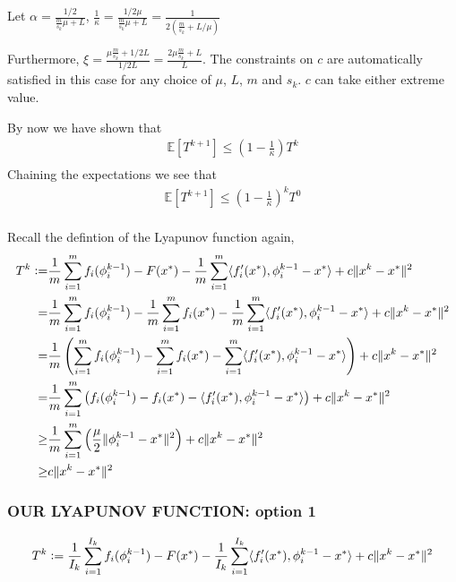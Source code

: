 \documentclass[11pt]{article}
\newcommand{\defeqq}{\vcentcolon=}
\begin{document}
		Let $\alpha = \frac{1/2}{\frac{m}{s_k}\mu+L}$, $\frac{1}{\kappa} = \frac{1/2 \mu}{ \frac{m}{s_k}\mu+L}=\frac{1}{2( \frac{m}{s_k}+L/\mu)}$
		
		Furthermore, $\xi =\frac{\mu \frac{m}{s_k}+1/2L}{1/2 L }  = \frac{2 \mu \frac{m}{s_k}+L}{ L }$. The constraints on $c$ are automatically satisfied in this case for any choice of $\mu$, $L$, $m$ and $s_k$. $c$ can take either extreme value. 
		
By now we have shown that 
\begin{align*}
		\mathbb{E}\left[ T^{k+1} \right] \leq \left(1-\frac{1}{\kappa} \right) T^k \\
\end{align*}
Chaining the expectations we see that 
\begin{align*}
		\mathbb{E}\left[ T^{k+1} \right] \leq \left(1-\frac{1}{\kappa} \right)^k T^0 \\
\end{align*}

Recall the defintion of the Lyapunov function again, 
\begin{align*}
	T^k \defeqq &  \frac{1}{m} \sum_{i =1}^{m} f_i(\phi_i^{k-1}) - F(x^*) - \frac{1}{m}  \sum_{i =1}^{m} \langle f'_i(x^*), \phi_i^{k-1} - x^*\rangle + c \|x^k - x^* \|^2 \\
	= & \frac{1}{m} \sum_{i =1}^{m} f_i(\phi_i^{k-1}) - \frac{1}{m} \sum_{i =1}^{m} f_i(x^*) - \frac{1}{m}  \sum_{i =1}^{m} \langle f'_i(x^*), \phi_i^{k-1} - x^*\rangle + c \|x^k - x^* \|^2 \\
	= & \frac{1}{m} \left(\sum_{i =1}^{m} f_i(\phi_i^{k-1}) -  \sum_{i =1}^{m} f_i(x^*) -  \sum_{i =1}^{m} \langle f'_i(x^*), \phi_i^{k-1} - x^*\rangle  \right) + c \|x^k - x^* \|^2 \\
	= & \frac{1}{m}\sum_{i =1}^{m} \left( f_i(\phi_i^{k-1}) -  f_i(x^*) - \langle f'_i(x^*), \phi_i^{k-1} - x^*\rangle  \right) + c \|x^k - x^* \|^2 \\
	\geq & \frac{1}{m}\sum_{i =1}^{m} \left(  \frac{\mu}{2} \| \phi_i^{k-1} - x^*\| ^2 \right) + c \|x^k - x^* \|^2 \\
	\geq &  c \|x^k - x^* \|^2
\end{align*}
\newpage

\subsubsection{OUR LYAPUNOV FUNCTION: option 1}

\begin{equation}
	T^k \defeqq \frac{1}{I_k} \sum_{i =1}^{I_k} f_i(\phi_i^{k-1}) - F(x^*) - \frac{1}{I_k}  \sum_{i =1}^{I_k} \langle f'_i(x^*), \phi_i^{k-1} - x^*\rangle + c \|x^k - x^* \|^2
\end{equation}
\end{document}
